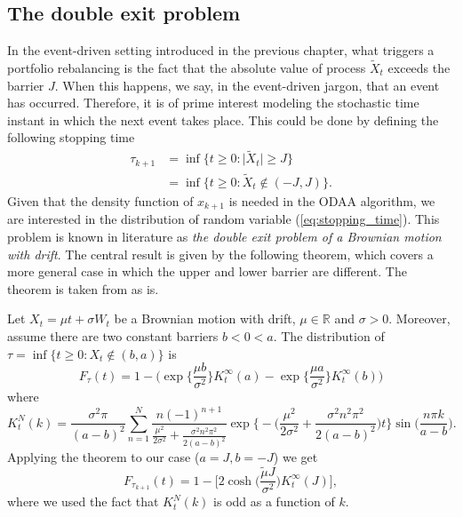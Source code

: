 \subsection{The double exit problem }
In the event-driven setting introduced in the previous chapter, what triggers a portfolio rebalancing is the fact that the absolute value of process $\widetilde{X}_t$ exceeds the barrier $J$. When this happens, we say, in the event-driven jargon, that an event has occurred. Therefore, it is of prime interest  modeling the stochastic time instant in which the next event takes place. This could be done by defining the following stopping time
\begin{align}\label{eq:stopping_time}
\tau_{k+1} & = \inf\big\{t\geq 0 \colon \lvert\widetilde{X}_t\lvert\geq J \big\}\\\nonumber
& = \inf\big\{t\geq 0 \colon \widetilde{X}_t \notin (-J,J) \big\}.
\end{align}
Given that the density function of $x_{k+1}$ is needed in the \gls{ODAA} algorithm, we are interested in the distribution of random variable (\ref{eq:stopping_time}). This problem is known in literature as \textit{the double exit problem of a Brownian motion with drift}. The central result is given by the following theorem, which covers a more general case in which the upper and lower barrier are different. The theorem is taken from \cite{Hieber2012} as is.
\begin{theorem}\label{thm:double_exit_problem}
	Let $X_t = \mu t + \sigma W_t$ be a Brownian motion with drift, $\mu \in \mathbb{R}$ and $\sigma > 0$. Moreover, assume there are two constant barriers $b<0<a$. The distribution of $\tau = \inf\big\{t\geq 0 \colon X_t \notin (b,a) \big\}$ is 
	\[
	F_{\tau}(t) = 1-\bigg(\exp\Big\{\frac{\mu b}{\sigma^2}\Big\}K_t^{\infty}(a)-\exp\Big\{\frac{\mu a}{\sigma^2}\Big\}K_t^{\infty}(b) \bigg)
	\]
	where
	\[
	K_t^N(k)= \frac{\sigma^2\pi}{(a-b)^2}\sum_{n=1}^{N}\frac{n(-1)^{n+1}}{\frac{\mu^2}{2\sigma^2}+\frac{\sigma^2n^2\pi^2}{2(a-b)^2}}\exp\bigg\{-\bigg(\frac{\mu^2}{2\sigma^2}+\frac{\sigma^2n^2\pi^2}{2(a-b)^2}\bigg)t\bigg\}\sin\Big(\frac{n\pi k}{a-b}\Big).
	\]
	Applying the theorem to our case ($a=J, b=-J$) we get 
	\begin{equation}\label{eq:cdf_ext1}
	F_{\tau_{k+1}}(t)=1-\bigg[2\cosh\Big(\frac{\widetilde{\mu}J}{\sigma^2}\Big)K_t^{\infty}(J)\bigg],
	\end{equation}
	where we used the fact that $K_t^N(k)$ is odd as a function of $k$.
\end{theorem}

